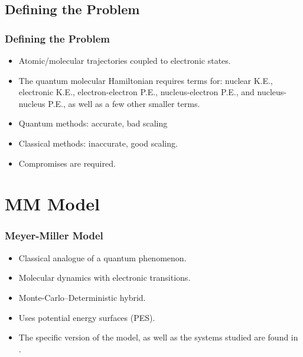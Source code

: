 \documentclass[xetex,mathserif,serif]{beamer}
\let\oldcite=\cite
\renewcommand\cite[1]{\hyperlink{#1}{\oldcite{#1}}}
\begin{document}
\subsection{Defining the Problem}
\begin{frame}
\frametitle{Defining the Problem}
\begin{itemize}
\item Atomic/molecular trajectories coupled to electronic states.
\item The quantum molecular Hamiltonian requires terms for: nuclear K.E., electronic K.E., electron-electron P.E., nucleus-electron P.E., and nucleus-nucleus P.E., as well as a few other smaller terms.
\item Quantum methods: accurate, bad scaling
\item Classical methods: inaccurate, good scaling.
\item Compromises are required.
\end{itemize}
\end{frame}

\section{MM Model}
\begin{frame}
\frametitle{Meyer-Miller Model}
\begin{itemize}
\item Classical analogue of a quantum phenomenon.
\item Molecular dynamics with electronic transitions.
\item Monte-Carlo--Deterministic hybrid.
\item Uses potential energy surfaces (PES).
\item The specific version of the model, as well as the systems studied are found in \textcolor{blue}{\cite{project}}.
\end{itemize}
\end{frame}
\end{document}
